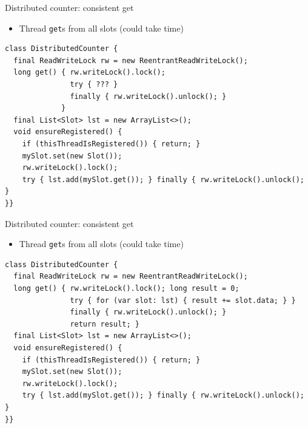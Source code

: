 \begin{frame}{Distributed counter: consistent get}

\begin{itemize}
    \item Thread \texttt{get}s from all slots (could take time)
\end{itemize}

\begin{verbatim}
class DistributedCounter {
  final ReadWriteLock rw = new ReentrantReadWriteLock();
  long get() { rw.writeLock().lock();
               try { ??? }  
               finally { rw.writeLock().unlock(); }
             }
  final List<Slot> lst = new ArrayList<>();
  void ensureRegistered() {
    if (thisThreadIsRegistered()) { return; }
    mySlot.set(new Slot());
    rw.writeLock().lock(); 
    try { lst.add(mySlot.get()); } finally { rw.writeLock().unlock(); }
}}
\end{verbatim}
\end{frame}

\begin{frame}{Distributed counter: consistent get}

\begin{itemize}    
    \item Thread \texttt{get}s from all slots (could take time)
\end{itemize}

\begin{verbatim}
class DistributedCounter {
  final ReadWriteLock rw = new ReentrantReadWriteLock();
  long get() { rw.writeLock().lock(); long result = 0;
               try { for (var slot: lst) { result += slot.data; } }  
               finally { rw.writeLock().unlock(); }
               return result; }
  final List<Slot> lst = new ArrayList<>();
  void ensureRegistered() {
    if (thisThreadIsRegistered()) { return; }
    mySlot.set(new Slot());
    rw.writeLock().lock(); 
    try { lst.add(mySlot.get()); } finally { rw.writeLock().unlock(); }
}}
\end{verbatim}
\end{frame}

